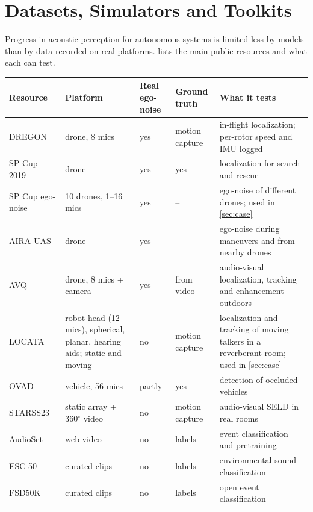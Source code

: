 \section{Datasets, Simulators and Toolkits}
\label{sec:datasets}

Progress in acoustic perception for autonomous systems is limited less by models than by data recorded on real platforms.
 lists the main public resources and what each can test.

\begin{table}[t]
\centering
\footnotesize
\setlength{\tabcolsep}{3pt}
\begin{tabular}{@{}L{3.1cm}L{2.0cm}L{1.3cm}L{1.4cm}L{7.6cm}@{}}
\toprule
Resource & Platform & Real ego-noise & Ground truth & What it tests \\
\midrule
DREGON~\cite{strauss2018dregon} & drone, 8 mics & yes & motion capture & in-flight localization; per-rotor speed and IMU logged \\
SP Cup 2019~\cite{deleforge2019spcup} & drone & yes & yes & localization for search and rescue \\
SP Cup ego-noise~\cite{deleforge2019spcup} & 10 drones, 1--16 mics & yes & -- & ego-noise of different drones; used in \cref{sec:case} \\
AIRA-UAS~\cite{ruizespitia2018aira} & drone & yes & -- & ego-noise during maneuvers and from nearby drones \\
AVQ~\cite{wang2019avq} & drone, 8 mics + camera & yes & from video & audio-visual localization, tracking and enhancement outdoors \\
LOCATA~\cite{lollmann2018locata,evers2020locata} & robot head (12 mics), spherical, planar, hearing aids; static and moving & no & motion capture & localization and tracking of moving talkers in a reverberant room; used in \cref{sec:case} \\
OVAD~\cite{schulz2021hearing} & vehicle, 56 mics & partly & yes & detection of occluded vehicles \\
STARSS23~\cite{shimada2023starss23} & static array + 360$^\circ$ video & no & motion capture & audio-visual SELD in real rooms \\
AudioSet~\cite{gemmeke2017audioset} & web video & no & labels & event classification and pretraining \\
ESC-50~\cite{piczak2015esc} & curated clips & no & labels & environmental sound classification \\
FSD50K~\cite{fonseca2022fsd50k} & curated clips & no & labels & open event classification \\

\end{tabular}
\end{table}
